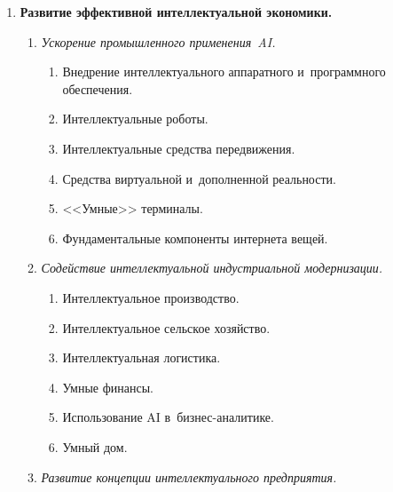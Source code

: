 \begin{enumerate}[1.]
\begin{enumerate}[{1}.1]
\end{enumerate}


\item \textbf{Развитие эффективной интеллектуальной экономики.}


\begin{enumerate}[{2}.1]


\item \textit{Ускорение промышленного применения~AI.}


\begin{enumerate}[{2.1}.1]


\item Внедрение интеллектуального аппаратного и~программного обеспечения.


\item Интеллектуальные роботы.


\item Интеллектуальные средства передвижения.


\item Средства виртуальной и~дополненной ре\-аль\-ности.


\item <<Умные>> терминалы.


\item Фундаментальные компоненты интернета вещей.


\end{enumerate}


\item \textit{Содействие интеллектуальной индустриальной модернизации.}


\begin{enumerate}[{2.2}.1]


\item Интеллектуальное производство.


\item Интеллектуальное сельское хозяйство.


\item Интеллектуальная логистика.


\item Умные финансы.


\item Использование AI в~бизнес-ана\-ли\-ти\-ке.


\item Умный дом.


\end{enumerate}


\item \textit{Развитие концепции интеллектуального предприятия.}



\end{enumerate}
\end{enumerate}
